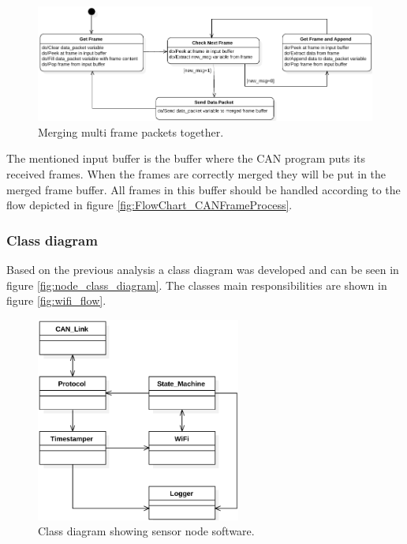 \begin{figure}[!h]
\centering
\includegraphics[width=1\textwidth]{graphics/StateDiagram_ConcatMsgProcess}
\caption{Merging multi frame packets together.}
\label{fig:StateDiagram_ConcatMsgProcess}
\end{figure}

The mentioned input buffer is the buffer where the CAN program puts its received frames. 
When the frames are correctly merged they will be put in the merged frame buffer.
All frames in this buffer should be handled according to the flow depicted in figure \ref{fig:FlowChart_CANFrameProcess}.

\subsubsection*{Class diagram}
Based on the previous analysis a class diagram was developed and can be seen in figure \ref{fig:node_class_diagram}.
The classes main responsibilities are shown in figure \ref{fig:wifi_flow}.

\begin{figure}[!h]
\centering
\includegraphics[width=0.6\textwidth]{graphics/ClassDiagram_NodeWiFi}
\caption{Class diagram showing sensor node software.}
\label{fig:StateDiagram_ConcatMsgProcess}
\end{figure}

